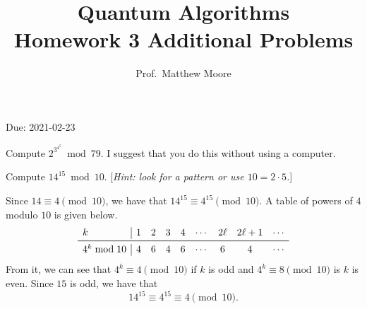 \documentclass[oneside]{amsart}  %
\theoremstyle{plain}
\theoremstyle{definition}
\theoremstyle{remark}
\newcommand{\ds}[1]{ \displaystyle{#1} }
\numberwithin{equation}{section}  %
\newif\ifsolutions
\begin{document}
\title[Quantum Algorithms, HW 3 Additional Problems]
  {Quantum Algorithms \\ Homework 3 Additional Problems}
\author{Prof.~Matthew Moore}
\maketitle

\vspace{-0.7em} \begin{center}
  \sc Due: 2021-02-23
\end{center}

\vspace{2em}

\begin{questions}
\item Compute $\ds{2^{3^{4^5}} \bmod 79}$. I suggest that you do this without
using a computer. 
\\ \noindent 
[\emph{Hint: $78 = 2\cdot 3\cdot 13$.}]
\item \begin{questions}
  \item Compute $14^{15} \bmod{10}$. [\emph{Hint: look for a pattern
    or use $10 = 2\cdot 5$.}]
\begin{solution}  %
Since $14\equiv 4 \pmod{10}$, we have that $14^{15} \equiv 4^{15}
\pmod{10}$. A table of powers of $4$ modulo $10$ is given below.
\[ \begin{array}{l|cccccccc}
  k             & 1 & 2 & 3 & 4 & \cdots & 2\ell & 2\ell + 1 & \cdots \\ \midrule
  4^k \bmod{10} & 4 & 6 & 4 & 6 & \cdots & 6     & 4         & \cdots
\end{array} \]
From it, we can see that $4^k \equiv 4 \pmod{10}$ if $k$ is odd and $4^k
\equiv 8\pmod{10}$ is $k$ is even. Since $15$ is odd, we have that
\[
  14^{15}
  \equiv 4^{15}
  \equiv 4 \pmod{10}.
\]


\end{solution}
\end{questions}
\end{questions}
\end{document}
